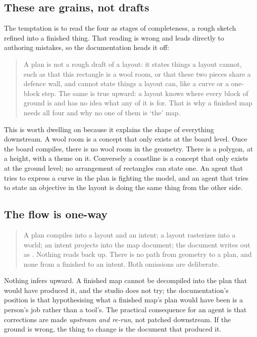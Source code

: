 \subsection*{These are grains, not drafts}

The temptation is to read the four as stages of completeness, a rough sketch
refined into a finished thing. That reading is wrong and leads directly
to authoring mistakes, so the documentation heads it off:

\begin{quote}
A plan is not a rough draft of a layout: it states things a layout cannot, such as
that this rectangle is a wool room, or that these two pieces share a defence wall,
and cannot state things a layout can, like a curve or a one-block step. The same is
true upward: a layout knows where every block of ground is and has no idea what
any of it is for. That is why a finished map needs all four and why no one of them
is `the' map.
\end{quote}

This is worth dwelling on because it explains the shape of everything downstream.
A wool room is a concept that only exists at the board level. Once the board
compiles, there is no wool room in the geometry. There is a polygon, at a height,
with a theme on it. Conversely a coastline is a concept that only exists
at the ground level; no arrangement of rectangles can state one. An agent that
tries to express a curve in the plan is fighting the model, and an agent that
tries to state an objective in the layout is doing the same thing from the other
side.

\subsection*{The flow is one-way}

\begin{quote}
A plan compiles into a layout and an intent; a layout rasterizes into a world; an
intent projects into the map document; the document writes out as .
Nothing reads back up. There is no path from geometry to a plan, and none from a
finished  to an intent. Both omissions are deliberate.
\end{quote}

Nothing infers upward. A finished map cannot be decompiled into the plan that
would have produced it, and the studio does not try; the documentation's position
is that hypothesising what a finished map's plan would have been is a person's job
rather than a tool's. The practical consequence for an agent is that corrections
are made \emph{upstream and re-run}, not patched downstream. If the ground is
wrong, the thing to change is the document that produced it.

